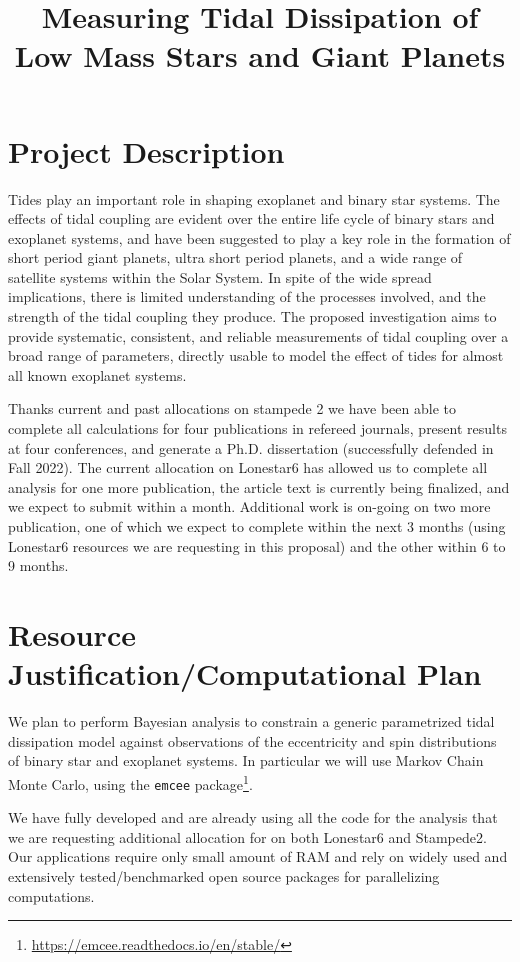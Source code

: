 \documentclass{article}
\title{Measuring Tidal Dissipation of Low Mass Stars and Giant Planets}
\begin{document}
\maketitle

\section{Project Description}

Tides play an important role in shaping exoplanet and binary star systems. The
effects of tidal coupling are evident over the entire life cycle of binary stars
and exoplanet systems, and have been suggested to play a key role in the
formation of short period giant planets, ultra short period planets, and a wide
range of satellite systems within the Solar System. In spite of the wide spread
implications, there is limited understanding of the processes involved, and the
strength of the tidal coupling they produce. The proposed investigation aims to
provide systematic, consistent, and reliable measurements of tidal coupling over
a broad range of parameters, directly usable to model the effect of tides for
almost all known exoplanet systems.

Thanks current and past allocations on stampede 2 we have been able to complete
all calculations for four publications in refereed journals, present results at
four conferences, and generate a Ph.D. dissertation (successfully defended in
Fall 2022). The current allocation on Lonestar6 has allowed us to complete all
analysis for one more publication, the article text is currently being
finalized, and we expect to submit within a month. Additional work is on-going
on two more publication, one of which we expect to complete within the next 3
months (using Lonestar6 resources we are requesting in this proposal) and the
other within 6 to 9 months.

\section{Resource Justification/Computational Plan}

We plan to perform Bayesian analysis to constrain a generic parametrized tidal
dissipation model against observations of the eccentricity and spin
distributions of binary star and exoplanet systems. In particular we will use
Markov Chain Monte Carlo, using the \texttt{emcee}
package\footnote{\url{https://emcee.readthedocs.io/en/stable/}}.

We have fully developed and are already using all the code for the analysis that
we are requesting additional allocation for on both Lonestar6 and Stampede2. Our
applications require only small amount of RAM and rely on widely used and
extensively tested/benchmarked open source packages for parallelizing
computations.
\end{document}
